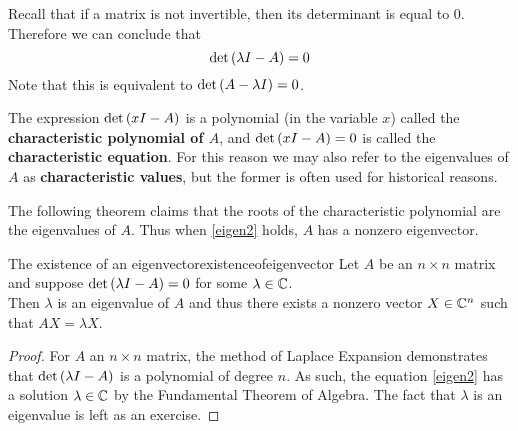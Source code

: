 Recall that if a matrix
is not invertible, then its determinant is equal to $0$.  Therefore we
can conclude that
\begin{equation}
\det \left(\lambda I - A\right) =0  \label{eigen2}
\end{equation}
Note that this is equivalent to $\det \left(A- \lambda I \right) =0$. 

The expression $\det \left(x I-A\right) $ is a polynomial (in
the variable $x$) called the
\textbf{characteristic polynomial of $A$}, and 
$\det \left(x I-A\right) =0$ is called the \textbf{characteristic
equation}. For this reason we may also refer to
the eigenvalues of $A$ as \textbf{characteristic values}, but the
former is often used for historical reasons.

The following theorem claims that the roots of the characteristic
polynomial are the eigenvalues of $A$.  Thus when \ref{eigen2}
holds, $A$ has a nonzero eigenvector.

\begin{theorem}{The existence of an eigenvector}{existenceofeigenvector}
Let $A$ be an $n\times n$ matrix and suppose $\det \left(\lambda I -
A\right) =0$ for some $ \lambda \in \mathbb{C}$.  \\
Then $\lambda$ is an eigenvalue of $A$ and thus there exists a nonzero
vector $X \in \mathbb{C}^{n}$ such that $AX=\lambda X$. 
\end{theorem}

\begin{proof}
For $A$ an $n\times n$ matrix, the method of Laplace
Expansion demonstrates that $\det \left(\lambda I - A \right) $ is a
polynomial of degree $n.$ As such, the equation
\ref{eigen2} has a solution $\lambda \in \mathbb{C}$ by the Fundamental
Theorem of Algebra. The fact that $\lambda$ is an eigenvalue is left as an exercise. 
\end{proof}

